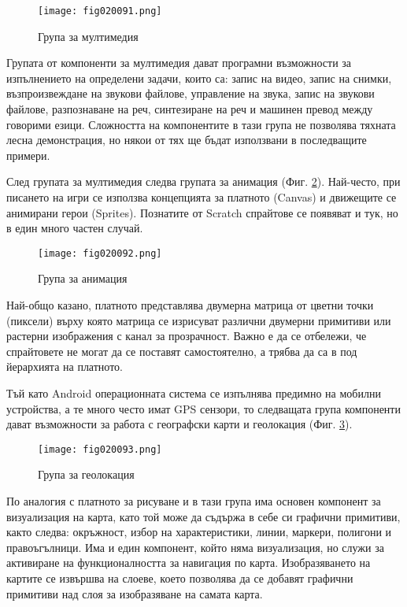 \begin{figure}[H]
  \centering
  \texttt{[image: fig020091.png]}
  \caption{Група за мултимедия}
\label{fig020091}
\end{figure}

Групата от компоненти за мултимедия дават програмни възможности за изпълнението на определени задачи, които са: запис на видео, запис на снимки, възпроизвеждане на звукови файлове, управление на звука, запис на звукови файлове, разпознаване на реч, синтезиране на реч и машинен превод между говорими езици. Сложността на компонентите в тази група не позволява тяхната лесна демонстрация, но някои от тях ще бъдат използвани в последващите примери. 

След групата за мултимедия следва групата за анимация (Фиг. \ref{fig020092}). Най-често, при писането на игри се използва концепцията за платното (Canvas) и движещите се анимирани герои (Sprites). Познатите от Scratch спрайтове се появяват и тук, но в един много частен случай. 

\begin{figure}[H]
  \centering
  \texttt{[image: fig020092.png]}
  \caption{Група за анимация}
\label{fig020092}
\end{figure}

Най-общо казано, платното представлява двумерна матрица от цветни точки (пиксели) върху която матрица се изрисуват различни двумерни примитиви или растерни изображения с канал за прозрачност. Важно е да се отбележи, че спрайтовете не могат да се поставят самостоятелно, а трябва да са в под йерархията на платното. 

Тъй като Android операционната система се изпълнява предимно на мобилни устройства, а те много често имат GPS сензори, то следващата група компоненти дават възможности за работа с географски карти и геолокация (Фиг. \ref{fig020093}). 

\begin{figure}[H]
  \centering
  \texttt{[image: fig020093.png]}
  \caption{Група за геолокация}
\label{fig020093}
\end{figure}

По аналогия с платното за рисуване и в тази група има основен компонент за визуализация на карта, като той може да съдържа в себе си графични примитиви, както следва: окръжност, избор на характеристики, линии, маркери, полигони и правоъгълници. Има и един компонент, който няма визуализация, но служи за активиране на функционалността за навигация по карта. Изобразяването на картите се извършва на слоеве, което позволява да се добавят графични примитиви над слоя за изобразяване на самата карта. 

